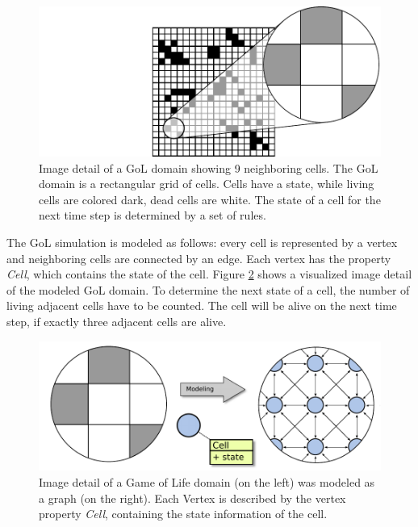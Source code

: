 \begin{figure}[H]
  \centering \includegraphics[width=\textwidth]{graphics/30_gol_simulation}
  \caption{Image detail of a GoL domain showing 9 neighboring cells. The GoL
    domain is a rectangular grid of cells.  Cells have a state, while
    living cells are colored dark, dead cells are white. The state of
    a cell for the next time step is determined by a set of rules.}
  \label{fig:gol_simulation}
\end{figure}

\noindent The GoL simulation is modeled as follows:
every cell is represented by a vertex and neighboring cells are
connected by an edge.  Each vertex has the property \emph{Cell}, which
contains the state of the cell. Figure \ref{fig:gol_modeling} shows a
visualized image detail of the modeled GoL domain. To determine the next
state of a cell, the number of living adjacent cells have to be counted. The cell
will be alive on the next time step, if exactly three adjacent cells
are alive.


\begin{figure}[H]
  \centering \includegraphics[width=\textwidth]{graphics/30_gol_modeling}
  \caption{Image detail of a Game of Life domain (on the left) was modeled
    as a graph (on the right). Each Vertex is described by the vertex
    property \emph{Cell}, containing the state information of the cell.}
  \label{fig:gol_modeling}
\end{figure}

